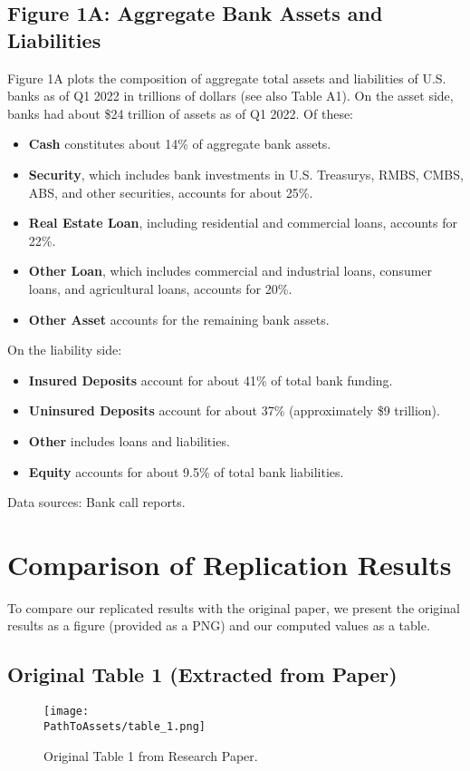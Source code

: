 \documentclass{article}
\begin{document}
\subsection{Figure 1A: Aggregate Bank Assets and Liabilities}
Figure 1A plots the composition of aggregate total assets and liabilities of U.S. banks as of Q1 2022 in trillions of dollars (see also Table A1). On the asset side, banks had about \$24 trillion of assets as of Q1 2022. Of these:

\begin{itemize}
    \item \textbf{Cash} constitutes about 14\% of aggregate bank assets.
    \item \textbf{Security}, which includes bank investments in U.S. Treasurys, RMBS, CMBS, ABS, and other securities, accounts for about 25\%.
    \item \textbf{Real Estate Loan}, including residential and commercial loans, accounts for 22\%.
    \item \textbf{Other Loan}, which includes commercial and industrial loans, consumer loans, and agricultural loans, accounts for 20\%.
    \item \textbf{Other Asset} accounts for the remaining bank assets.
\end{itemize}

On the liability side:

\begin{itemize}
    \item \textbf{Insured Deposits} account for about 41\% of total bank funding.
    \item \textbf{Uninsured Deposits} account for about 37\% (approximately \$9 trillion).
    \item \textbf{Other} includes loans and liabilities.
    \item \textbf{Equity} accounts for about 9.5\% of total bank liabilities.
\end{itemize}

Data sources: Bank call reports.

\section{Comparison of Replication Results}
To compare our replicated results with the original paper, we present the original results as a figure (provided as a PNG) and our computed values as a table.

\subsection{Original Table 1 (Extracted from Paper)}
\begin{figure}[H]
    \centering
    \texttt{[image: \\PathToAssets/table\_1.png]}
    \caption{Original Table 1 from Research Paper.}
\end{figure}
\end{document}
